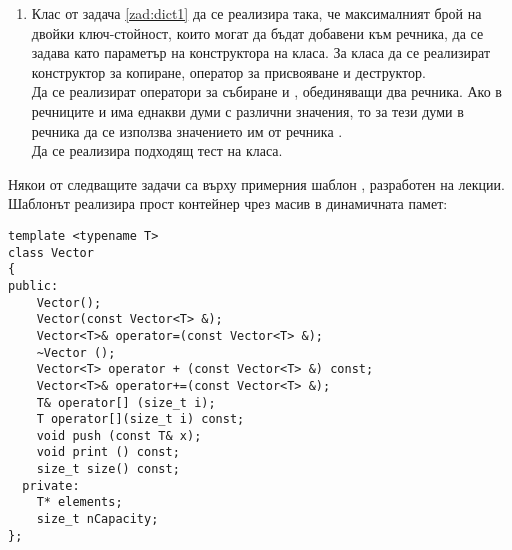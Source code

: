 \begin{enumerate}[resume]
  \item Клас  от задача \ref{zad:dict1} да се реализира така, че максималният брой  на двойки ключ-стойност, които могат да бъдат добавени към речника, да се задава като параметър на конструктора на класа. За класа да се реализират конструктор за копиране, оператор за присвояване и деструктор.\\

 Да се реализират оператори за събиране \code{+} и \code{+=}, обединяващи два речника. Ако в речниците  и  има еднакви думи с различни значения, то за тези думи в речника  да се използва значението им от речника . \\

 Да се реализира подходящ тест на класа.

\end{enumerate}
\begin{mdframed}[hidealllines=true,backgroundcolor=gray!20]
Някои от следващите задачи са върху примерния шаблон , разработен на лекции. Шаблонът реализира прост контейнер чрез масив в динамичната памет:
\begin{verbatim}
template <typename T>
class Vector
{
public:
    Vector();
    Vector(const Vector<T> &);
    Vector<T>& operator=(const Vector<T> &);
    ~Vector ();
    Vector<T> operator + (const Vector<T> &) const;
    Vector<T>& operator+=(const Vector<T> &);
    T& operator[] (size_t i);
    T operator[](size_t i) const;
    void push (const T& x);
    void print () const;
    size_t size() const;
  private:
    T* elements;
    size_t nCapacity;
};

\end{verbatim}
\end{mdframed}
